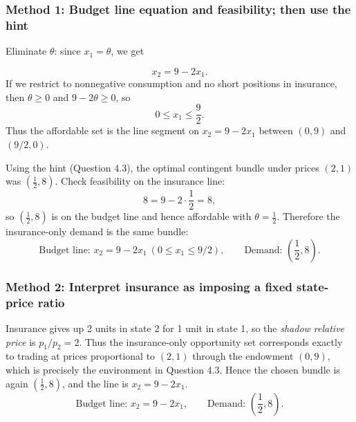 \documentclass[12pt]{article}
\begin{document}
\newpage


\subsubsection*{Method 1: Budget line equation and feasibility; then use the hint}



Eliminate \(\theta\): since \(x_1=\theta\), we get

\[
x_2=9-2x_1.
\]
If we restrict to nonnegative consumption and no short positions in insurance, then \(\theta\ge 0\) and \(9-2\theta\ge 0\), so
\[
0\le x_1\le \frac{9}{2}.
\]
Thus the affordable set is the line segment on \(x_2=9-2x_1\) between \((0,9)\) and \((9/2,0)\).

Using the hint (Question 4.3), the optimal contingent bundle under prices \((2,1)\) was \(\left(\frac12,8\right)\).
Check feasibility on the insurance line:
\[
8=9-2\cdot\frac12=8,
\]
so \(\left(\frac12,8\right)\) is on the budget line and hence affordable with \(\theta=\frac12\).
Therefore the insurance-only demand is the same bundle:
\[
\boxed{\;\text{Budget line: }x_2=9-2x_1\ (0\le x_1\le 9/2),\qquad \text{Demand: }\left(\frac12,8\right).\;}
\]




\subsubsection*{Method 2: Interpret insurance as imposing a fixed state-price ratio}
Insurance gives up 2 units in state 2 for 1 unit in state 1, so the \emph{shadow relative price} is \(p_1/p_2=2\).
Thus the insurance-only opportunity set corresponds exactly to trading at prices proportional to \((2,1)\) through the endowment \((0,9)\),
which is precisely the environment in Question 4.3. Hence the chosen bundle is again \(\left(\frac12,8\right)\), and the line is \(x_2=9-2x_1\).
\[
\boxed{\;\text{Budget line: }x_2=9-2x_1,\qquad \text{Demand: }\left(\frac12,8\right).\;}
\]
\end{document}
